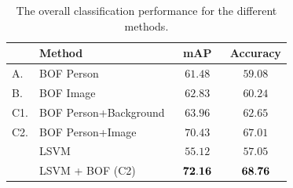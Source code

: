 \documentclass{bmvc2k}
\newcommand{\red}[1]{{\em \small \color{red} #1}} %
\newcommand{\tfs}{\small}   %
\newcommand{\cfs}{\small}   %
\begin{document}

\begin{table}[tbp]
\centering
{}
\begin{tabular}{|l|l||c|c|}
\hline
& \tfs Method                   &\tfs$~~~$mAP$~~~$& \tfs Accuracy  \\ \hline 
\tfs A.   & \tfs BOF Person          & \tfs $61.48$ & \tfs $59.08$ \\ \hline 
\tfs B.   & \tfs BOF Image           & \tfs $62.83$ & \tfs $60.24 $ \\ \hline 
\tfs C1. & \tfs BOF Person+Background& \tfs $63.96$ & \tfs $62.65$ \\ \hline 
\tfs C2. & \tfs BOF Person+Image     & \tfs $70.43$ & \tfs $67.01$ \\ \hline \hline
       & \tfs LSVM              & \tfs $55.12$ & \tfs $57.05$   \\ \hline \hline 
       & \tfs LSVM +  BOF (C2)	 & \tfs ${\bf 72.16}$ & \tfs ${\bf 68.76}$   \\ \hline 
\end{tabular}
\caption{\cfs The overall classification performance for the different methods. \normalsize}
\label{tab:methods}
\end{table}
\end{document}
